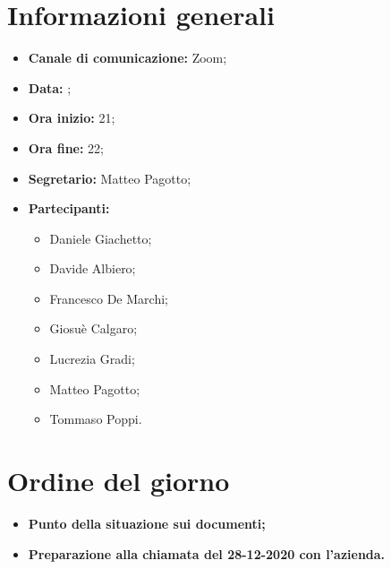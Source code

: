 \section{Informazioni generali}

\begin{itemize}

	\item \textbf{Canale di comunicazione:} Zoom;
	
	\item \textbf{Data:} \DataMeeting{};
	
	\item \textbf{Ora inizio:} 21;
	
	\item \textbf{Ora fine:} 22;
	
	\item \textbf{Segretario:} Matteo Pagotto;
	
	\item \textbf{Partecipanti:}
	
		\begin{itemize}
		
			\item Daniele Giachetto;
			\item Davide Albiero;
			\item Francesco De Marchi;
			\item Giosuè Calgaro;
			\item Lucrezia Gradi;
			\item Matteo Pagotto;
			\item Tommaso Poppi.
				 
		\end{itemize}

\end{itemize}

\section{Ordine del giorno}

\begin{itemize}

	\item\textbf{Punto della situazione sui documenti;}
	
	\item\textbf{Preparazione alla chiamata del 28-12-2020 con l'azienda.}

\end{itemize}

\newpage


